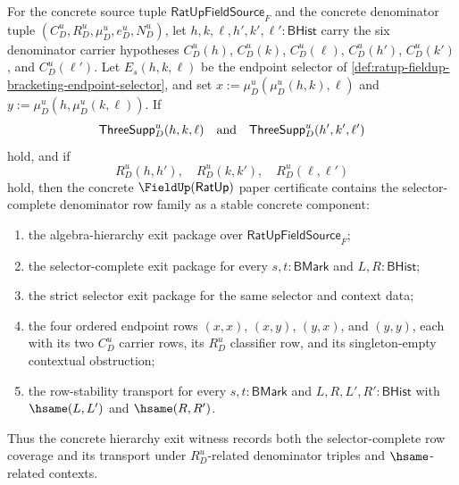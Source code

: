 \begin{theorem}
\label{thm:ratup-fieldup-selector-complete-hierarchy-exit-witness}
For the concrete source tuple $\mathsf{RatUpFieldSource}_F$ and the concrete
denominator tuple $(C_D^u,R_D^u,\mu_D^u,e_D^u,N_D^u)$, let
$h,k,\ell,h',k',\ell':\mathsf{BHist}$ carry the six denominator carrier
hypotheses
$C_D^u(h)$, $C_D^u(k)$, $C_D^u(\ell)$, $C_D^u(h')$, $C_D^u(k')$, and
$C_D^u(\ell')$. Let $E_s(h,k,\ell)$ be the endpoint selector of
\autoref{def:ratup-fieldup-bracketing-endpoint-selector}, and set
$x:=\mu_D^u(\mu_D^u(h,k),\ell)$ and
$y:=\mu_D^u(h,\mu_D^u(k,\ell))$. If
$$
\mathsf{ThreeSupp}_D^u(h,k,\ell)
\quad\hbox{and}\quad
\mathsf{ThreeSupp}_D^u(h',k',\ell')
$$
hold, and if
$$
R_D^u(h,h'),\quad R_D^u(k,k'),\quad R_D^u(\ell,\ell')
$$
hold, then the concrete $\FieldUp(\mathsf{RatUp})$ paper certificate contains
the selector-complete denominator row family as a stable concrete component:
\begin{enumerate}
  \item the algebra-hierarchy exit package over $\mathsf{RatUpFieldSource}_F$;
  \item the selector-complete exit package for every $s,t:\mathsf{BMark}$ and
  $L,R:\mathsf{BHist}$;
  \item the strict selector exit package for the same selector and context data;
  \item the four ordered endpoint rows $(x,x)$, $(x,y)$, $(y,x)$, and $(y,y)$,
  each with its two $C_D^u$ carrier rows, its $R_D^u$ classifier row, and its
  singleton-empty contextual obstruction;
  \item the row-stability transport for every $s,t:\mathsf{BMark}$ and
  $L,R,L',R':\mathsf{BHist}$ with $\hsame(L,L')$ and $\hsame(R,R')$.
\end{enumerate}
Thus the concrete hierarchy exit witness records both the selector-complete row
coverage and its transport under $R_D^u$-related denominator triples and
$\hsame$-related contexts.
\end{theorem}
